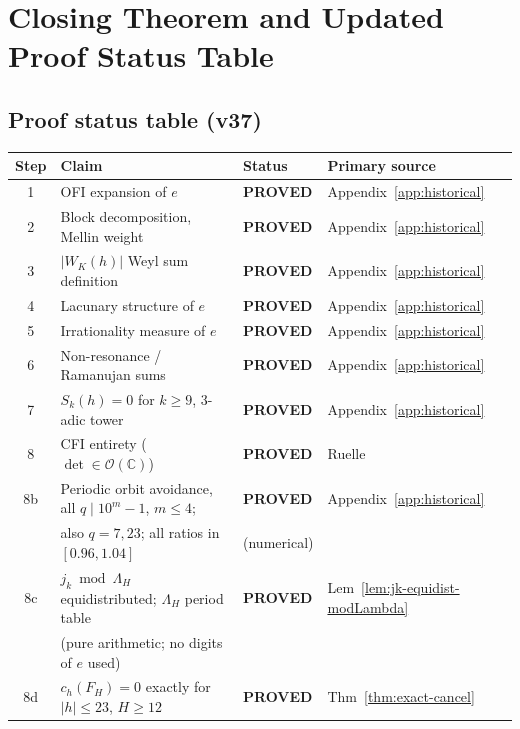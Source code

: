 \documentclass[
]{article}
\begin{document}
\section{Closing Theorem and Updated Proof Status Table}
\label{sec:closing-theorem}


\subsection{Proof status table (v37)}\label{sec:proof-status-table}

\begin{center}
\renewcommand{\arraystretch}{1.2}
\begin{tabular}{clll}
\toprule
Step & Claim & Status & Primary source \\
\midrule
1 & OFI expansion of $e$ & \textbf{PROVED} & Appendix~\ref{app:historical} \\
2 & Block decomposition, Mellin weight & \textbf{PROVED} & Appendix~\ref{app:historical} \\
3 & $|W_K(h)|$ Weyl sum definition & \textbf{PROVED} & Appendix~\ref{app:historical} \\
4 & Lacunary structure of $e$ & \textbf{PROVED} & Appendix~\ref{app:historical} \\
5 & Irrationality measure of $e$ & \textbf{PROVED} & Appendix~\ref{app:historical} \\
6 & Non-resonance / Ramanujan sums & \textbf{PROVED} & Appendix~\ref{app:historical} \\
7 & $S_k(h)=0$ for $k\ge 9$, 3-adic tower & \textbf{PROVED} & Appendix~\ref{app:historical} \\
8 & CFI entirety ($\det\in\mathcal{O}(\mathbb{C})$) & \textbf{PROVED} & Ruelle \cite{Ruelle90} \\
8b & Periodic orbit avoidance, all $q\mid 10^m-1$, $m\le 4$; & \textbf{PROVED} & Appendix~\ref{app:historical} \\
   & also $q=7,23$; all ratios in $[0.96,1.04]$ & (numerical) & \\
8c & $j_k\bmod\Lambda_H$ equidistributed; $\Lambda_H$ period table & \textbf{PROVED} & Lem~\ref{lem:jk-equidist-modLambda} \\
   & \quad (pure arithmetic; no digits of $e$ used) & & \\
8d & $c_h(F_H)=0$ exactly for $|h|\le 23$, $H\ge 12$ & \textbf{PROVED} & Thm~\ref{thm:exact-cancel} \\

\end{tabular}
\end{center}
\end{document}
